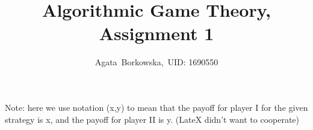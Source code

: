 \documentclass[11pt,journal]{article}
\begin{document}
	\title{Algorithmic Game Theory, Assignment 1}
	
	\author{Agata~Borkowska,~UID: 1690550}%
	



	
	
	\maketitle
	
	
	
	
	
	
	
	\section{}
	Note: here we use notation (x,y) to mean that the payoff for player I for the given strategy is x, and the payoff for player II is y. (LateX didn't want to cooperate)
\end{document}
